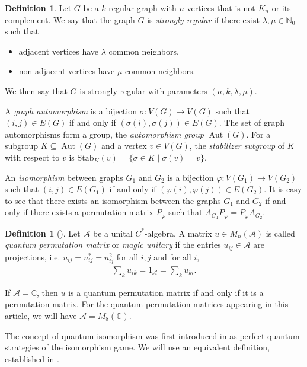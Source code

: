 \documentclass[11pt]{article}
\theoremstyle{definition}
\newtheorem{defi}[theo]{Definition}
\numberwithin{equation}{section}
\newcommand{\N}{\mathbb{N}}
\newcommand{\C}{\mathbb{C}}
\DeclareMathOperator{\aut}{Aut}
\begin{document}
\begin{defi}
Let $G$ be a $k$-regular graph with $n$ vertices that is not $K_n$ or its complement. We say that the graph $G$ is \emph{strongly regular} if there exist $\lambda, \mu\in \N_0$ such that
\begin{itemize}
    \item[(i)] adjacent vertices have $\lambda$ common neighbors,
    \item[(ii)] non-adjacent vertices have $\mu$ common neighbors. 
\end{itemize}
We then say that $G$ is strongly regular with parameters $(n, k, \lambda, \mu)$.
\end{defi}

A \emph{graph automorphism} is a bijection $\sigma:V(G)\to V(G)$ such that $(i,j)\in E(G)$ if and only if $(\sigma(i), \sigma(j))\in E(G)$. The set of graph automorphisms form a group, the \emph{automorphism group} $\aut(G)$. For a subgroup $K\subseteq \aut(G)$ and a vertex $v\in V(G)$, the \emph{stabilizer subgroup} of $K$ with respect to $v$ is $\mathrm{Stab}_K(v)=\{\sigma \in K \mid \sigma(v)=v\}$.

An \emph{isomorphism} between graphs $G_1$ and $G_2$ is a bijection $\varphi:V(G_1) \to V(G_2)$ such that $(i,j)\in E(G_1)$ if and only if $(\varphi(i), \varphi(j))\in E(G_2)$. It is easy to see that there exists an isomorphism between the graphs $G_1$ and $G_2$ if and only if there exists a permutation matrix $P_{\varphi}$ such that $A_{G_1}P_{\varphi}=P_{\varphi}A_{G_2}$. 

\begin{defi}[\cite{WanSn}]
Let $\mathcal{A}$ be a unital $C^*$-algebra. A matrix $u\in M_n(\mathcal{A})$ is called \emph{quantum permutation matrix} or \emph{magic unitary} if the entries $u_{ij}\in \mathcal{A}$ are projections, i.e. $u_{ij}=u_{ij}^*=u_{ij}^2$ for all $i,j$ and for all $i$,
\begin{align*}
    \sum_k u_{ik}=1_{\mathcal{A}}=\sum_k u_{ki}.
\end{align*}
\end{defi}
If $\mathcal{A}=\C$, then $u$ is a quantum permutation matrix if and only if it is a permutation matrix. For the quantum permutation matrices appearing in this article, we will have $\mathcal{A}=M_8(\C)$. 

The concept of quantum isomorphism was first introduced in \cite{AMRSSV} as perfect quantum strategies of the isomorphism game. We will use an equivalent definition, established in \cite{LMR}. 
\end{document}
